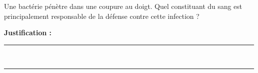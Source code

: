 Une bactérie pénètre dans une coupure au doigt. Quel constituant du sang est principalement responsable de la défense contre cette infection ?

\choices

\noindent\textbf{Justification :} \hrulefill \\[2.5ex]
\rule{\linewidth}{0.4pt} \\[2.5ex]
\rule{\linewidth}{0.4pt}
\vfill
